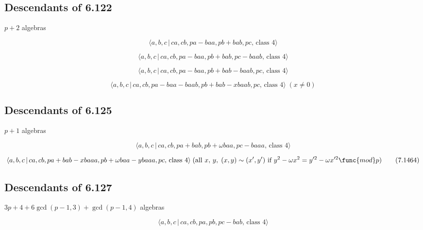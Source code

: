 \documentclass[10pt]{article}
\begin{document}
\subsection{Descendants of 6.122}

$p+2$ algebras

\begin{equation}
\langle a,b,c\,|\,ca,cb,pa-baa,pb+bab,pc,\,\text{class }4\rangle 
\tag{7.1459}
\end{equation}

\begin{equation}
\langle a,b,c\,|\,ca,cb,pa-baa,pb+bab,pc-baab,\,\text{class }4\rangle 
\tag{7.1460}
\end{equation}

\begin{equation}
\langle a,b,c\,|\,ca,cb,pa-baa,pb+bab-baab,pc,\,\text{class }4\rangle 
\tag{7.1461}
\end{equation}

\begin{equation}
\langle a,b,c\,|\,ca,cb,pa-baa-baab,pb+bab-xbaab,pc,\,\text{class }4\rangle
\;(x \neq 0)  \tag{7.1462}
\end{equation}

\subsection{Descendants of 6.125}

$p+1$ algebras

\begin{equation}
\langle a,b,c\,|\,ca,cb,pa+bab,pb+\omega baa,pc-baaa,\,\text{class }4\rangle
\tag{7.1463}
\end{equation}

\begin{equation}
\langle a,b,c\,|\,ca,cb,pa+bab-xbaaa,pb+\omega baa-ybaaa,pc,\,\text{class }%
4\rangle \;(\text{all }x,\,y,\;(x,y)\sim (x^{\prime },y^{\prime })\text{ if }%
y^{2}-\omega x^{2}=y^{\prime 2}-\omega x^{\prime 2}\func{mod}p)  \tag{7.1464}
\end{equation}

\subsection{Descendants of 6.127}

$3p+4+6\gcd (p-1,3)+\gcd (p-1,4)$ algebras

\begin{equation}
\langle a,b,c\,|\,ca,cb,pa,pb,pc-bab,\,\text{class }4\rangle  \tag{7.1465}
\end{equation}
\end{document}
